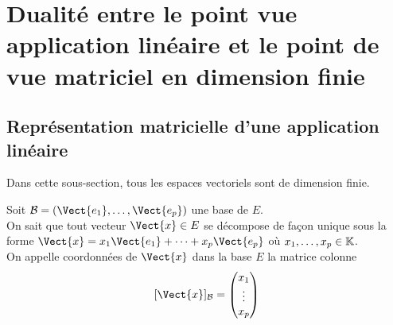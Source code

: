 \documentclass{book}
\begin{document}
\section{Dualité entre le point vue application linéaire et le  point de vue matriciel en dimension finie}

\subsection{Représentation matricielle d'une application linéaire}
Dans cette sous-section, tous les espaces vectoriels sont de dimension finie.\\
\begin{Definition}
Soit $\mathcal{B} = (\Vect{e_1},\dots,\Vect{e_p})$ une base de $E$.\\
On sait que tout vecteur $\Vect{x}\in  E$ se décompose de façon unique sous la forme
$\Vect{x} = x_1 \Vect{e_1} + \dots + x_p \Vect{e_p}$ où $x_1,\dots, x_p \in   \mathbb{K}$.\\
On appelle coordonnées de $\Vect{x}$ dans la base $E$ la matrice colonne
\[ [\Vect{x}]_\mathcal{B} = \begin{pmatrix}
x_1\\\vdots\\x_p\\
\end{pmatrix} \]
\end{Definition}
\end{document}
